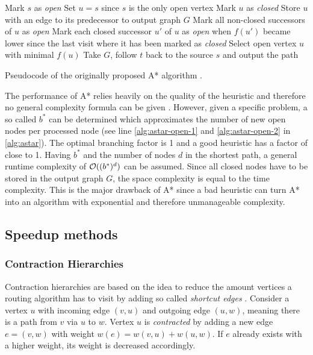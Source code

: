 			\begin{algorithm}[h]
				\begin{algorithmic}[1]
					\State Mark $s$ as \emph{open}
					\State Set $u = s$ since $s$ is the only open vertex
						\State Mark $u$ as \emph{closed}
						\State Store $u$ with an edge to its predecessor to output graph $G$
						\State Mark all non-closed successors of $u$ as \emph{open} \label{alg:astar-open-1}
						\State Mark each closed successor $u'$ of $u$ as \emph{open} when $f(u')$ became lower since the last visit where it has been marked as \emph{closed} \label{alg:astar-open-2}
						\State Select open vertex $u$ with minimal $f(u)$
					\EndWhile
					\State Take $G$, follow $t$ back to the source $s$ and output the path
				\end{algorithmic}
				\caption{Pseudocode of the originally proposed A* algorithm \cite{astar}.}
				\label{alg:astar}
			\end{algorithm}
			
			The performance of A* relies heavily on the quality of the heuristic and therefore no general complexity formula can be given \cite{russell-norvig-ai-modern-approach}.
			However, given a specific problem, a so called  $b^*$ can be determined which approximates the number of new open nodes per processed node (see line \ref{alg:astar-open-1} and \ref{alg:astar-open-2} in \cref{alg:astar}).
			The optimal branching factor is 1 and a good heuristic has a factor of close to 1.
			Having $b^*$ and the number of nodes $d$ in the shortest path, a general runtime complexity of $\mathcal{O}((b^*)^d)$ can be assumed.
			Since all closed nodes have to be stored in the output graph $G$, the space complexity is equal to the time complexity.
			This is the major drawback of A* since a bad heuristic can turn A* into an algorithm with exponential and therefore unmanageable complexity.
		
	\subsection{Speedup methods}
	\label{subsec:speedup-methods}
		
		\subsubsection{Contraction Hierarchies}
		\label{subsubsec:ch}
		
			Contraction hierarchies are based on the idea to reduce the amount vertices a routing algorithm has to visit by adding so called \emph{shortcut edges} \cite{geisberger-contraction-hierarchies}.
			Consider a vertex $u$ with incoming edge $(v, u)$ and outgoing edge $(u, w)$, meaning there is a path from $v$ via $u$ to $w$.
			Vertex $u$ is \emph{contracted} by adding a new edge $e = (v, w)$ with weight $w(e) = w(v, u) + w(u, w)$.
			If $e$ already exists with a higher weight, its weight is decreased accordingly.
			
